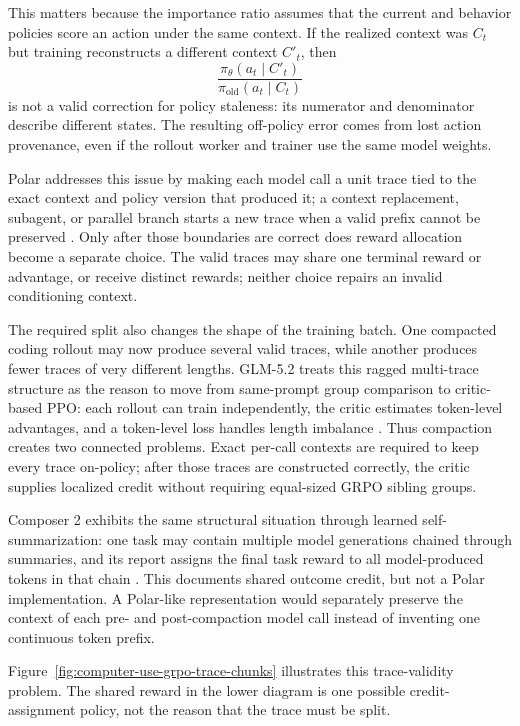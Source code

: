 This matters because the importance ratio assumes that the current and behavior policies
score an action under the same context. If the realized context was $C_t$ but training
reconstructs a different context $C'_t$, then
\begin{equation}
  \frac{\pi_\theta(a_t\mid C'_t)}{\pi_{\mathrm{old}}(a_t\mid C_t)}
\end{equation}
is not a valid correction for policy staleness: its numerator and denominator describe
different states. The resulting off-policy error comes from lost action provenance, even
if the rollout worker and trainer use the same model weights.

Polar addresses this issue by making each model call a unit trace tied to the exact context
and policy version that produced it; a context replacement, subagent, or parallel branch
starts a new trace when a valid prefix cannot be preserved \citep{glm5team2026,xu2026polar}.
Only after those boundaries are correct does reward allocation become a separate choice.
The valid traces may share one terminal reward or advantage, or receive distinct rewards;
neither choice repairs an invalid conditioning context.

The required split also changes the shape of the training batch. One compacted coding
rollout may now produce several valid traces, while another produces fewer traces of very
different lengths. GLM-5.2 treats this ragged multi-trace structure as the reason to move
from same-prompt group comparison to critic-based PPO: each rollout can train
independently, the critic estimates token-level advantages, and a token-level loss handles
length imbalance \citep{glm52team2026}. Thus compaction creates two connected problems.
Exact per-call contexts are required to keep every trace on-policy; after those traces are
constructed correctly, the critic supplies localized credit without requiring equal-sized
GRPO sibling groups.

Composer 2 exhibits the same structural situation through learned self-summarization: one
task may contain multiple model generations chained through summaries, and its report
assigns the final task reward to all model-produced tokens in that chain
\citep{cursor2026composer2}. This documents shared outcome credit, but not a Polar
implementation. A Polar-like representation would separately preserve the context of each
pre- and post-compaction model call instead of inventing one continuous token prefix.

Figure~\ref{fig:computer-use-grpo-trace-chunks} illustrates this trace-validity problem.
The shared reward in the lower diagram is one possible credit-assignment policy, not the
reason that the trace must be split.

